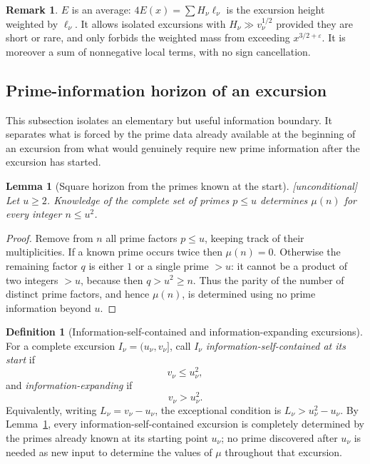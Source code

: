 \documentclass[11pt,reqno]{amsart}
\theoremstyle{plain}
\newtheorem{lemma}[theorem]{Lemma}
\theoremstyle{definition}
\newtheorem{definition}[theorem]{Definition}
\newtheorem{remark}[theorem]{Remark}
\newcommand{\eps}{\varepsilon}
\begin{document}
\begin{remark}
\label{rem:average}
$E$ is an average: $4E(x)=\sum H_\nu\ell_\nu$ is the excursion height
weighted by $\ell_\nu$. It allows isolated excursions with
$H_\nu\gg v_\nu^{1/2}$ provided they are short or rare, and only forbids the
weighted mass from exceeding $x^{3/2+\eps}$. It is moreover a sum of
nonnegative local terms, with no sign cancellation.
\end{remark}


\subsection{Prime-information horizon of an excursion}
\label{subsec:prime-horizon}

This subsection isolates an elementary but useful information boundary.  It
separates what is forced by the prime data already available at the beginning
of an excursion from what would genuinely require new prime information after
the excursion has started.

\begin{lemma}[Square horizon from the primes known at the start]
\label{lem:square-horizon}
\emph{[unconditional]} Let $u\ge2$.  Knowledge of the complete set of primes
$p\le u$ determines $\mu(n)$ for every integer $n\le u^2$.
\end{lemma}

\begin{proof}
Remove from $n$ all prime factors $p\le u$, keeping track of their
multiplicities.  If a known prime occurs twice then $\mu(n)=0$.  Otherwise the
remaining factor $q$ is either $1$ or a single prime $>u$: it cannot be a
product of two integers $>u$, because then $q>u^2\ge n$.  Thus the parity of
the number of distinct prime factors, and hence $\mu(n)$, is determined using
no prime information beyond $u$.
\end{proof}

\begin{definition}[Information-self-contained and information-expanding excursions]
\label{def:information-excursion}
For a complete excursion $I_\nu=(u_\nu,v_\nu]$, call $I_\nu$
\emph{information-self-contained at its start} if
\[
  v_\nu\le u_\nu^2,
\]
and \emph{information-expanding} if
\[
  v_\nu>u_\nu^2.
\]
Equivalently, writing $L_\nu=v_\nu-u_\nu$, the exceptional condition is
$L_\nu>u_\nu^2-u_\nu$.  By Lemma~\ref{lem:square-horizon}, every
information-self-contained excursion is completely determined by the primes
already known at its starting point $u_\nu$; no prime discovered after
$u_\nu$ is needed as new input to determine the values of $\mu$ throughout
that excursion.
\end{definition}
\end{document}
